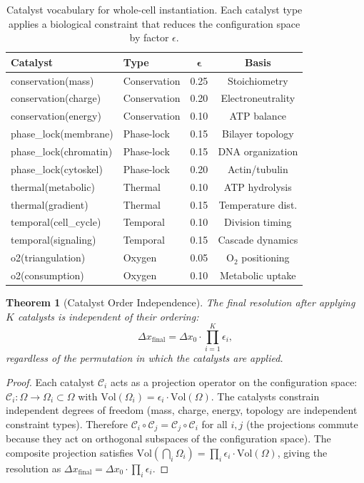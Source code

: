 \documentclass[twocolumn,10pt,a4paper]{article}
\newtheorem{theorem}{Theorem}[section]
\theoremstyle{definition}
\theoremstyle{remark}
\newcommand{\catalyst}{\mathcal{C}}
\begin{document}
\begin{table}[t]
\centering
\caption{Catalyst vocabulary for whole-cell instantiation. Each catalyst type applies a biological constraint that reduces the configuration space by factor $\epsilon$.}
\label{tab:catalysts}
\begin{tabular}{@{}llcc@{}}
\toprule
\textbf{Catalyst} & \textbf{Type} & $\bm{\epsilon}$ & \textbf{Basis} \\
\midrule
conservation(mass) & Conservation & 0.25 & Stoichiometry \\
conservation(charge) & Conservation & 0.20 & Electroneutrality \\
conservation(energy) & Conservation & 0.10 & ATP balance \\
phase\_lock(membrane) & Phase-lock & 0.15 & Bilayer topology \\
phase\_lock(chromatin) & Phase-lock & 0.15 & DNA organization \\
phase\_lock(cytoskel) & Phase-lock & 0.20 & Actin/tubulin \\
thermal(metabolic) & Thermal & 0.10 & ATP hydrolysis \\
thermal(gradient) & Thermal & 0.15 & Temperature dist. \\
temporal(cell\_cycle) & Temporal & 0.10 & Division timing \\
temporal(signaling) & Temporal & 0.15 & Cascade dynamics \\
o2(triangulation) & Oxygen & 0.05 & O$_2$ positioning \\
o2(consumption) & Oxygen & 0.10 & Metabolic uptake \\
\bottomrule
\end{tabular}
\end{table}

\begin{theorem}[Catalyst Order Independence]
\label{thm:catalyst_order}
The final resolution after applying $K$ catalysts is independent of their ordering:
\begin{equation}
    \Delta x_{\mathrm{final}} = \Delta x_0 \cdot \prod_{i=1}^{K} \epsilon_i,
    \label{eq:order_independence}
\end{equation}
regardless of the permutation in which the catalysts are applied.
\end{theorem}

\begin{proof}
Each catalyst $\catalyst_i$ acts as a projection operator on the configuration space: $\catalyst_i: \Omega \to \Omega_i \subset \Omega$ with $\mathrm{Vol}(\Omega_i) = \epsilon_i \cdot \mathrm{Vol}(\Omega)$. The catalysts constrain independent degrees of freedom (mass, charge, energy, topology are independent constraint types). Therefore $\catalyst_i \circ \catalyst_j = \catalyst_j \circ \catalyst_i$ for all $i, j$ (the projections commute because they act on orthogonal subspaces of the configuration space). The composite projection satisfies $\mathrm{Vol}(\bigcap_i \Omega_i) = \prod_i \epsilon_i \cdot \mathrm{Vol}(\Omega)$, giving the resolution as $\Delta x_{\mathrm{final}} = \Delta x_0 \cdot \prod_i \epsilon_i$.
\end{proof}
\end{document}
